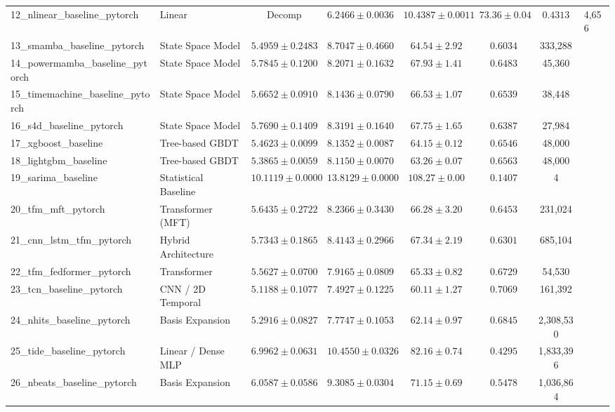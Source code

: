 \begin{table}[t]
{\begin{tabular}{l l c c c c c}
12\_nlinear\_baseline\_pytorch & Linear & Decomp & $6.2466 \pm 0.0036$ & $10.4387 \pm 0.0011$ & $73.36 \pm 0.04$ & $0.4313$ & 4,656 \\
13\_smamba\_baseline\_pytorch & State Space Model & $5.4959 \pm 0.2483$ & $8.7047 \pm 0.4660$ & $64.54 \pm 2.92$ & $0.6034$ & 333,288 \\
14\_powermamba\_baseline\_pytorch & State Space Model & $5.7845 \pm 0.1200$ & $8.2071 \pm 0.1632$ & $67.93 \pm 1.41$ & $0.6483$ & 45,360 \\
15\_timemachine\_baseline\_pytorch & State Space Model & $5.6652 \pm 0.0910$ & $8.1436 \pm 0.0790$ & $66.53 \pm 1.07$ & $0.6539$ & 38,448 \\
16\_s4d\_baseline\_pytorch & State Space Model & $5.7690 \pm 0.1409$ & $8.3191 \pm 0.1640$ & $67.75 \pm 1.65$ & $0.6387$ & 27,984 \\
17\_xgboost\_baseline & Tree-based GBDT & $5.4623 \pm 0.0099$ & $8.1352 \pm 0.0087$ & $64.15 \pm 0.12$ & $0.6546$ & 48,000 \\
18\_lightgbm\_baseline & Tree-based GBDT & $5.3865 \pm 0.0059$ & $8.1150 \pm 0.0070$ & $63.26 \pm 0.07$ & $0.6563$ & 48,000 \\
19\_sarima\_baseline & Statistical Baseline & $10.1119 \pm 0.0000$ & $13.8129 \pm 0.0000$ & $108.27 \pm 0.00$ & $0.1407$ & 4 \\
20\_tfm\_mft\_pytorch & Transformer (MFT) & $5.6435 \pm 0.2722$ & $8.2366 \pm 0.3430$ & $66.28 \pm 3.20$ & $0.6453$ & 231,024 \\
21\_cnn\_lstm\_tfm\_pytorch & Hybrid Architecture & $5.7343 \pm 0.1865$ & $8.4143 \pm 0.2966$ & $67.34 \pm 2.19$ & $0.6301$ & 685,104 \\
22\_tfm\_fedformer\_pytorch & Transformer & $5.5627 \pm 0.0700$ & $7.9165 \pm 0.0809$ & $65.33 \pm 0.82$ & $0.6729$ & 54,530 \\
23\_tcn\_baseline\_pytorch & CNN / 2D Temporal & $5.1188 \pm 0.1077$ & $7.4927 \pm 0.1225$ & $60.11 \pm 1.27$ & $0.7069$ & 161,392 \\
24\_nhits\_baseline\_pytorch & Basis Expansion & $5.2916 \pm 0.0827$ & $7.7747 \pm 0.1053$ & $62.14 \pm 0.97$ & $0.6845$ & 2,308,530 \\
25\_tide\_baseline\_pytorch & Linear / Dense MLP & $6.9962 \pm 0.0631$ & $10.4550 \pm 0.0326$ & $82.16 \pm 0.74$ & $0.4295$ & 1,833,396 \\
26\_nbeats\_baseline\_pytorch & Basis Expansion & $6.0587 \pm 0.0586$ & $9.3085 \pm 0.0304$ & $71.15 \pm 0.69$ & $0.5478$ & 1,036,864 \\

\end{tabular}}
\end{table}
